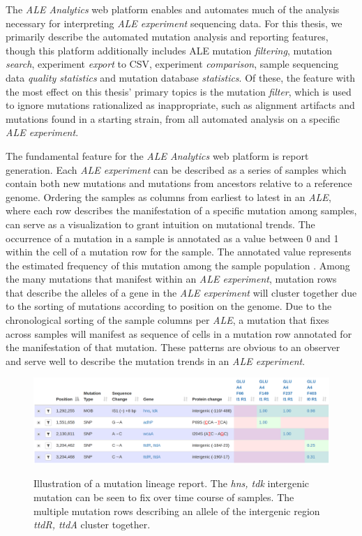 \documentclass[12pt,final,masters,chapterheads]{ucsd}  %
\begin{document}
The \textit{ALE Analytics} web platform enables and automates much of the analysis necessary for interpreting \textit{ALE experiment} sequencing data. For this thesis, we primarily describe the automated mutation analysis and reporting features, though this platform additionally includes ALE mutation \textit{filtering}, mutation \textit{search}, experiment \textit{export} to CSV, experiment \textit{comparison}, sample sequencing data \textit{quality statistics} and mutation database \textit{statistics}. Of these, the feature with the most effect on this thesis' primary topics is the mutation \textit{filter}, which is used to ignore mutations rationalized as inappropriate, such as alignment artifacts and mutations found in a starting strain, from all automated analysis on a specific \textit{ALE experiment}.

The fundamental feature for the \textit{ALE Analytics} web platform is report generation. Each \textit{ALE experiment} can be described as a series of samples which contain both new mutations and mutations from ancestors relative to a reference genome. Ordering the samples as columns from earliest to latest in an \textit{ALE}, where each row describes the manifestation of a specific mutation among samples, can serve as a visualization to grant intuition on mutational trends. The occurrence of a mutation in a sample is annotated as a value between 0 and 1 within the cell of a mutation row for the sample. The annotated value represents the estimated frequency of this mutation among the sample population \cite{breseq_paper}. Among the many mutations that manifest within an \textit{ALE experiment}, mutation rows that describe the alleles of a gene in the \textit{ALE experiment} will cluster together due to the sorting of mutations according to position on the genome. Due to the chronological sorting of the sample columns per \textit{ALE}, a mutation that fixes across samples will manifest as sequence of cells in a mutation row annotated for the manifestation of that mutation. These patterns are obvious to an observer and serve well to describe the mutation trends in an \textit{ALE experiment}.

\begin{figure}[H]
  \caption{Illustration of a mutation lineage report. The \textit{hns, tdk} intergenic mutation can be seen to fix over time course of samples. The multiple mutation rows describing an allele of the intergenic region \textit{ttdR, ttdA} cluster together.}
  \centering
  \includegraphics[width=1\textwidth]{mutation_lineage_report.png}
  \label{fig:mutation_lineage_report}
\end{figure}
\end{document}
